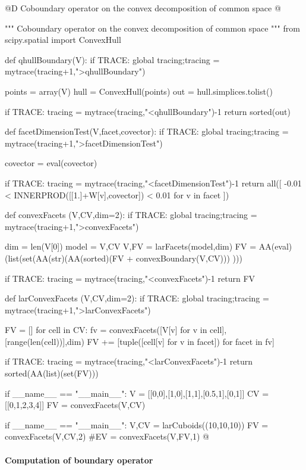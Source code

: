 \documentclass[11pt,oneside]{article}	%
\begin{document}
@D Coboundary operator on the convex decomposition of common space
@{""" Coboundary operator on the convex decomposition of common space """
from scipy.spatial import ConvexHull

def qhullBoundary(V):
	if TRACE: global tracing;tracing = mytrace(tracing+1,">qhullBoundary")

	points = array(V)
	hull = ConvexHull(points)
	out = hull.simplices.tolist()

	if TRACE: tracing = mytrace(tracing,"<qhullBoundary")-1
	return sorted(out)

def facetDimensionTest(V,facet,covector):
	if TRACE: global tracing;tracing = mytrace(tracing+1,">facetDimensionTest")

	covector = eval(covector)

	if TRACE: tracing = mytrace(tracing,"<facetDimensionTest")-1
	return all([ -0.01 < INNERPROD([[1.]+W[v],covector]) < 0.01 for v in facet ])

def convexFacets (V,CV,dim=2):
	if TRACE: global tracing;tracing = mytrace(tracing+1,">convexFacets")

	dim = len(V[0])
	model = V,CV
	V,FV = larFacets(model,dim)	
	FV = AA(eval)(list(set(AA(str)(AA(sorted)(FV + convexBoundary(V,CV))) )))

	if TRACE: tracing = mytrace(tracing,"<convexFacets")-1
	return FV

def larConvexFacets (V,CV,dim=2):
	if TRACE: global tracing;tracing = mytrace(tracing+1,">larConvexFacets")

	FV = []
	for cell in CV: 
		fv = convexFacets([V[v] for v in cell],[range(len(cell))],dim)
		FV += [tuple([cell[v] for v in facet]) for facet in fv]

	if TRACE: tracing = mytrace(tracing,"<larConvexFacets")-1
	return sorted(AA(list)(set(FV)))
	
if __name__ == "__main__":
	V = [[0,0],[1,0],[1,1],[0.5,1],[0,1]]
	CV = [[0,1,2,3,4]]
	FV = convexFacets(V,CV)
	
if __name__ == "__main__":
	V,CV = larCuboids((10,10,10))
	FV = convexFacets(V,CV,2)
	#EV = convexFacets(V,FV,1)
@}


\paragraph{Computation of boundary operator}
\end{document}
